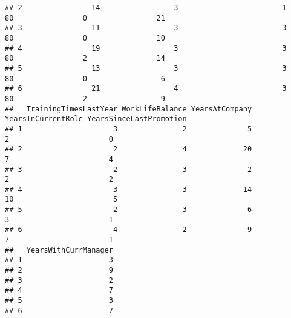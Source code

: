 \documentclass[
]{article}
\begin{document}
\begin{verbatim}
## 2                14                 3                        1            80                0                21
## 3                11                 3                        3            80                0                10
## 4                19                 3                        3            80                2                14
## 5                13                 3                        3            80                0                 6
## 6                21                 4                        3            80                2                 9
##   TrainingTimesLastYear WorkLifeBalance YearsAtCompany YearsInCurrentRole YearsSinceLastPromotion
## 1                     3               2              5                  2                       0
## 2                     2               4             20                  7                       4
## 3                     2               3              2                  2                       2
## 4                     3               3             14                 10                       5
## 5                     2               3              6                  3                       1
## 6                     4               2              9                  7                       1
##   YearsWithCurrManager
## 1                    3
## 2                    9
## 3                    2
## 4                    7
## 5                    3
## 6                    7
\end{verbatim}
\end{document}
